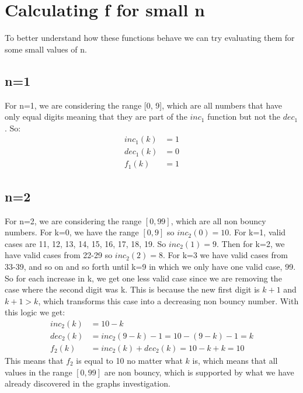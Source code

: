\documentclass[titlepage,12pt]{article}
\begin{document}
\section{Calculating f for small n}
To better understand how these functions behave we can try evaluating them for some small values of n.
\subsection{n=1}
For n=1, we are considering the range [0, 9], which are all numbers that have only equal digits meaning that they are part of the $inc_1$ function but not the $dec_1$. So:
\begin{align*}
    inc_1(k) &= 1\\
    dec_1(k) &= 0\\
    f_1(k) &= 1
\end{align*}

\subsection{n=2}
For n=2, we are considering the range $[0, 99]$, which are all non bouncy numbers. For k=0, we have the range $[0, 9]$ so $inc_2(0)=10$.
For k=1, valid cases are 11, 12, 13, 14, 15, 16, 17, 18, 19. So $inc_2(1)=9$. Then for k=2, we have valid cases from 22-29 so $inc_2(2)=8$. For k=3 we have valid cases from 33-39, and so on and so forth until k=9 in which we only have one valid case, 99.
So for each increase in k, we get one less valid case since we are removing the case where the second digit was k. This is because the new first digit is $k+1$ and $k+1 > k$, which transforms this case into a decreasing non bouncy number. With this logic we get:
\begin{align*}
    inc_2(k) &= 10-k\\
    dec_2(k) &= inc_2(9-k) - 1 = 10-(9-k)-1= k\\
    f_2(k) &= inc_2(k) + dec_2(k) = 10-k + k = 10
\end{align*}
This means that $f_2$ is equal to 10 no matter what $k$ is, which means that all values in the range $[0, 99]$ are non bouncy, which is supported by what we have already discovered in the graphs investigation.
\end{document}
